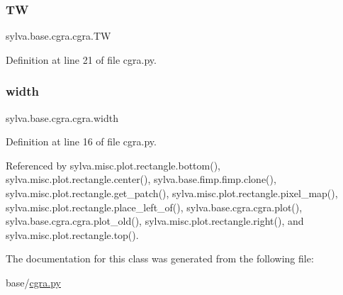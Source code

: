 \subsubsection{\texorpdfstring{TW}{TW}}
{\footnotesize\ttfamily sylva.\+base.\+cgra.\+cgra.\+TW}



Definition at line 21 of file cgra.\+py.

\mbox{\label{classsylva_1_1base_1_1cgra_1_1cgra_a9efe9218f0c8eb76d2afa0337af1c0f2}} 
\subsubsection{\texorpdfstring{width}{width}}
{\footnotesize\ttfamily sylva.\+base.\+cgra.\+cgra.\+width}



Definition at line 16 of file cgra.\+py.



Referenced by sylva.\+misc.\+plot.\+rectangle.\+bottom(), sylva.\+misc.\+plot.\+rectangle.\+center(), sylva.\+base.\+fimp.\+fimp.\+clone(), sylva.\+misc.\+plot.\+rectangle.\+get\+\_\+patch(), sylva.\+misc.\+plot.\+rectangle.\+pixel\+\_\+map(), sylva.\+misc.\+plot.\+rectangle.\+place\+\_\+left\+\_\+of(), sylva.\+base.\+cgra.\+cgra.\+plot(), sylva.\+base.\+cgra.\+cgra.\+plot\+\_\+old(), sylva.\+misc.\+plot.\+rectangle.\+right(), and sylva.\+misc.\+plot.\+rectangle.\+top().



The documentation for this class was generated from the following file\+:\begin{DoxyCompactItemize}
\item 
base/\hyperlink{cgra_8py}{cgra.\+py}\end{DoxyCompactItemize}
